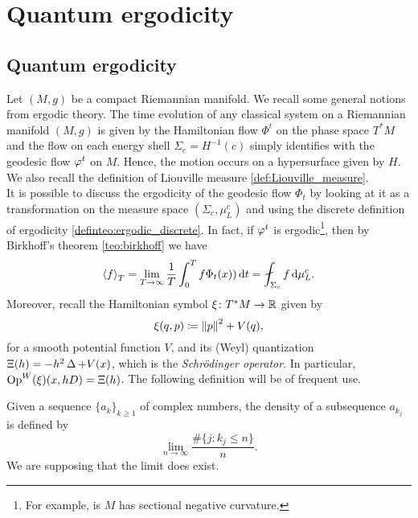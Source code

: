 
\chapter{Quantum ergodicity} %

\label{Chapter3} %
\thispagestyle{empty}

\section{Quantum ergodicity}

Let $(M,g)$ be a compact Riemannian manifold. We recall some general notions from ergodic theory. The time evolution of any classical system on a Riemannian manifold $(M,g)$ is given by the Hamiltonian flow $\Phi^{t}$ on the phase space $T^{\ast}M$ and the flow on each energy shell $\Sigma_{c}=H^{-1}(c)$ simply identifies with the geodesic flow $\varphi^{t}$ on $M$. Hence, the motion occurs on a hypersurface given by $H$. We also recall the definition of Liouville measure \ref{def:Liouville_measure}.\\
It is possible to discuss the ergodicity of the geodesic flow $\Phi_{t}$ by looking at it as a transformation on the measure space $(\Sigma_{c},\mu_{L}^{c})$ and using the discrete definition of ergodicity \ref{definteo:ergodic_discrete}. In fact, if $\varphi^{t}$ is ergodic\footnote{For example, is $M$ has sectional negative curvature.}, then by Birkhoff's theorem \ref{teo:birkhoff} we have
\[
\spn{f}_{T}=\lim_{T\to\infty}\frac{1}{T}\int_{0}^{T}f\Phi_{t}(x))\dd t =\fint_{\Sigma_{c}}f\dd\mu_{L}^{c}.
\]
Moreover, recall the Hamiltonian symbol $\operatorname{\xi}\colon T^{\ast}M\to\mathbb{R}$ given by
\[
\operatorname{\xi}(q,p)\coloneqq\left\lVert p\right\rVert^{2}+V(q),
\]
for a smooth potential function $V$, and its (Weyl) quantization $\Xi(h)=-h^{2}\operatorname{\Delta}+V(x)$, which is the \emph{Schr{\"o}dinger operator}. In particular, $\operatorname{Op}^{W}(\operatorname{\xi})(x,h D)=\Xi(h)$. The following definition will be of frequent use.

\begin{defin}
Given a sequence $\{a_{k}\}_{k\geq1}$ of complex numbers, the density of a subsequence $a_{k_{j}}$ is defined by 
\[
\lim_{n\to\infty}\frac{\#\{j\colon k_{j}\leq n\}}{n}.
\] 
We are supposing that the limit does exist.
\end{defin}



